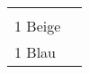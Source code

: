 \documentclass{article}
\begin{document}
\begin{table}[p]
  \begin{tabular}{ll}
    \hspace{-2em}    \fbox{\begin{minipage}[t][6cm][t]{8cm}
        \fontsize{60}{72} \selectfont
        \phantom{ }\\
      \phantom{ }1 Beige
    \end{minipage}}
    &
\fbox{\begin{minipage}[t][6cm][t]{8cm}
        \fontsize{60}{72} \selectfont
        \phantom{ }\\
        \phantom{ }1 Blau
      \end{minipage}}
  \end{tabular}
\end{table}
\end{document}
